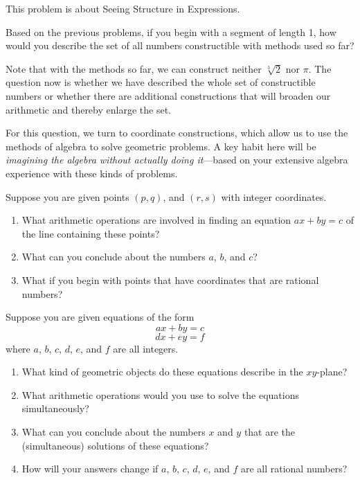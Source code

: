 \begin{teachingnote}
This problem is about Seeing Structure in Expressions.
\end{teachingnote}

\begin{prob}
Based on the previous problems, if you begin with a segment of length 1, how would you describe the set of all numbers constructible with methods used so far?    
\end{prob}

Note that with the methods so far, we can construct neither $\sqrt[3]{2}$ nor $\pi$.  The question now is whether we have described the whole set of constructible numbers or whether there are additional constructions that will broaden our arithmetic and thereby enlarge the set.  

For this question, we turn to coordinate constructions, which allow us to use the methods of algebra to solve geometric problems.  A key habit here will be \emph{imagining the algebra without actually doing it}---based on your extensive algebra experience with these kinds of problems.  

\begin{prob}
Suppose you are given points $(p, q)$, and $(r, s)$ with integer coordinates.  
\begin{enumerate}
\item What arithmetic operations are involved in finding an equation $ax+by=c$ of the line containing these points?  
\item What can you conclude about the numbers $a$, $b$, and $c$? 
\item What if you begin with points that have coordinates that are rational numbers?  
\end{enumerate}
\end{prob}

\begin{prob}
Suppose you are given equations of the form 
$$ax+by = c$$
$$dx+ey=f$$
where $a$, $b$, $c$, $d$, $e$, and $f$ are all integers.  
\begin{enumerate}
\item What kind of geometric objects do these equations describe in the $xy$-plane?  
\item What arithmetic operations would you use to solve the equations simultaneously? 
\item What can you conclude about the numbers $x$ and $y$ that are the (simultaneous) solutions of these equations?  
\item How will your answers change if $a$, $b$, $c$, $d$, $e$, and $f$ are all rational numbers?  
\end{enumerate}
\end{prob}

